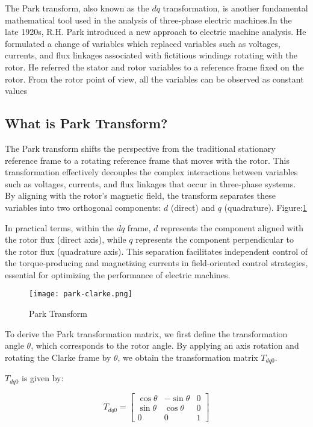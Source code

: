 The Park transform, also known as the \( dq \) transformation, is another
fundamental mathematical tool used in the analysis of three-phase electric
machines.In the late 1920s, R.H. Park\cite{R. H. Park} introduced a new
approach to electric machine analysis. He formulated a change of variables
which replaced variables such as voltages, currents, and flux linkages
associated with fictitious windings rotating with the rotor. He referred the
stator and rotor variables to a reference frame fixed on the rotor. From the
rotor point of view, all the variables can be observed as constant values
\subsection{What is Park Transform?}

The Park transform shifts the perspective from the traditional stationary
reference frame to a rotating reference frame that moves with the rotor. This
transformation effectively decouples the complex interactions between variables
such as voltages, currents, and flux linkages that occur in three-phase
systems. By aligning with the rotor's magnetic field, the transform separates
these variables into two orthogonal components: \( d \) (direct) and \( q \)
(quadrature). Figure:\ref{fig:Park Transform}

In practical terms, within the \( dq \) frame, \( d \) represents the component
aligned with the rotor flux (direct axis), while \( q \) represents the
component perpendicular to the rotor flux (quadrature axis). This separation
facilitates independent control of the torque-producing and magnetizing
currents in field-oriented control strategies, essential for optimizing the
performance of electric machines.\begin{figure}[h]
    \centering
    \texttt{[image: park-clarke.png]}
    \caption{Park Transform}
    \label{fig:Park Transform}
\end{figure}

To derive the Park transformation matrix, we first define the transformation
angle \( \theta \), which corresponds to the rotor angle. By applying an axis
rotation and rotating the Clarke frame by \( \theta \), we obtain the
transformation matrix \( T_{dq0} \).

\( T_{dq0} \) is given by:

\begin{equation*}
    T_{dq0} =
    \begin{bmatrix}
        \cos \theta & -\sin \theta & 0 \\
        \sin \theta & \cos \theta  & 0 \\
        0           & 0            & 1
    \end{bmatrix}
\end{equation*}


